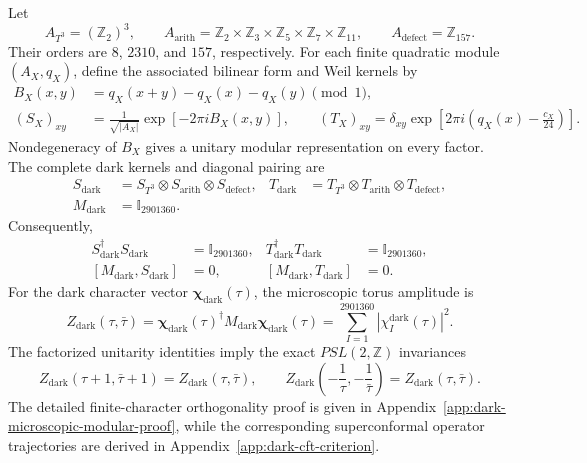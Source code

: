 \documentclass[11pt,letterpaper]{article}
\theoremstyle{plain}
\begin{document}
Let
\begin{equation}
\label{eq:section-three-dark-discriminant-groups}
 A_{T^3}=(\mathbb Z_2)^3,
 \qquad
 A_{\text{arith}}
 =
 \mathbb Z_2\times\mathbb Z_3\times\mathbb Z_5
 \times\mathbb Z_7\times\mathbb Z_{11},
 \qquad
 A_{\text{defect}}=\mathbb Z_{157}.
\end{equation}
Their orders are $8$, $2310$, and $157$, respectively.  For each finite
quadratic module $(A_X,q_X)$, define the associated bilinear form and Weil
kernels by
\begin{align}
\label{eq:section-three-dark-weil-kernels}
 B_X(x,y)
 &=
 q_X(x+y)-q_X(x)-q_X(y)
 \pmod 1,
 \\
 (S_X)_{xy}
 &=
 \frac{1}{\sqrt{|A_X|}}
 \exp\!\left[-2\pi i B_X(x,y)\right],
 \qquad
 (T_X)_{xy}
 =
 \delta_{xy}
 \exp\!\left[
 2\pi i\left(q_X(x)-\frac{c_X}{24}\right)
 \right].
\end{align}
Nondegeneracy of $B_X$ gives a unitary modular representation on every
factor.  The complete dark kernels and diagonal pairing are
\begin{align}
\label{eq:section-three-dark-kernel-factorization}
 S_{\text{dark}}
 &=
 S_{T^3}\otimes S_{\text{arith}}\otimes S_{\text{defect}},
 &
 T_{\text{dark}}
 &=
 T_{T^3}\otimes T_{\text{arith}}\otimes T_{\text{defect}},
 \\
\label{eq:section-three-dark-pairing}
 M_{\text{dark}}
 &=
 \mathbb I_{2901360}.
\end{align}
Consequently,
\begin{align}
\label{eq:section-three-dark-unitarity-commutants}
 S_{\text{dark}}^\dagger S_{\text{dark}}
 &=
 \mathbb I_{2901360},
 &
 T_{\text{dark}}^\dagger T_{\text{dark}}
 &=
 \mathbb I_{2901360},
 \\
 [M_{\text{dark}},S_{\text{dark}}]
 &=
 0,
 &
 [M_{\text{dark}},T_{\text{dark}}]
 &=
 0.
\end{align}
For the dark character vector
$\boldsymbol\chi_{\text{dark}}(\tau)$, the microscopic torus amplitude is
\begin{equation}
\label{eq:section-three-dark-torus-partition}
 Z_{\text{dark}}(\tau,\bar\tau)
 =
 \boldsymbol\chi_{\text{dark}}(\tau)^\dagger
 M_{\text{dark}}
 \boldsymbol\chi_{\text{dark}}(\tau)
 =
 \sum_{I=1}^{2901360}
 \left|\chi_I^{\text{dark}}(\tau)\right|^2.
\end{equation}
The factorized unitarity identities imply the exact
$PSL(2,\mathbb Z)$ invariances
\begin{equation}
\label{eq:section-three-dark-psl-invariance}
 Z_{\text{dark}}(\tau+1,\bar\tau+1)
 =
 Z_{\text{dark}}(\tau,\bar\tau),
 \qquad
 Z_{\text{dark}}\!\left(-\frac{1}{\tau},-\frac{1}{\bar\tau}\right)
 =
 Z_{\text{dark}}(\tau,\bar\tau).
\end{equation}
The detailed finite-character orthogonality proof is given in
Appendix~\ref{app:dark-microscopic-modular-proof}, while the corresponding
superconformal operator trajectories are derived in
Appendix~\ref{app:dark-cft-criterion}.
\end{document}
